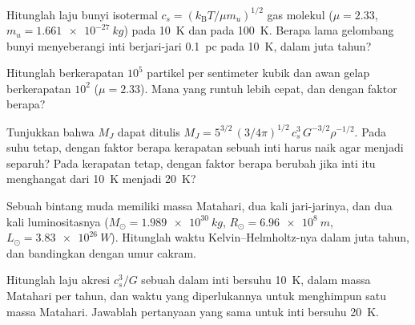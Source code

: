 \begin{exercise}[$\star$]\label{exo:b2:ism-star-formation:3}
Hitunglah laju bunyi isotermal $c_s = (k_{\mathrm B}T/\mu m_u)^{1/2}$ gas
molekul ($\mu = 2.33$, $m_u = \qty{1.661e-27}{kg}$) pada \qty{10}{K} dan pada
\qty{100}{K}. Berapa lama gelombang bunyi menyeberangi inti berjari-jari
\qty{0.1}{pc} pada \qty{10}{K}, dalam juta tahun?
\end{exercise}

\begin{exercise}[$\star$]\label{exo:b2:ism-star-formation:4}
Hitunglah   berkerapatan $10^5$ partikel per sentimeter
kubik dan awan gelap berkerapatan $10^2$ ($\mu = 2.33$). Mana yang runtuh
lebih cepat, dan dengan faktor berapa?
\end{exercise}

\begin{exercise}[$\star\star$]\label{exo:b2:ism-star-formation:5}
Tunjukkan bahwa $M_J$ dapat ditulis $M_J = 5^{3/2}\,(3/4\pi)^{1/2}\,c_s^3\,G^{-3/2}\rho^{-1/2}$.
Pada suhu tetap, dengan faktor berapa kerapatan sebuah inti harus naik agar 
menjadi separuh? Pada kerapatan tetap, dengan faktor berapa  berubah jika
inti itu menghangat dari \qty{10}{K} menjadi \qty{20}{K}?
\end{exercise}

\begin{exercise}[$\star\star$]\label{exo:b2:ism-star-formation:6}
Sebuah bintang muda memiliki massa Matahari, dua kali jari-jarinya, dan dua kali luminositasnya
($M_\odot = \qty{1.989e30}{kg}$, $R_\odot = \qty{6.96e8}{m}$,
$L_\odot = \qty{3.83e26}{W}$). Hitunglah waktu Kelvin--Helmholtz-nya dalam juta
tahun, dan bandingkan dengan umur cakram.
\end{exercise}

\begin{exercise}[$\star\star$]\label{exo:b2:ism-star-formation:7}
Hitunglah laju akresi $c_s^3/G$ sebuah  dalam inti bersuhu \qty{10}{K}, dalam
massa Matahari per tahun, dan waktu yang diperlukannya untuk menghimpun satu massa Matahari.
Jawablah pertanyaan yang sama untuk inti bersuhu \qty{20}{K}.
\end{exercise}

